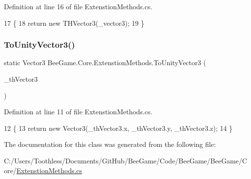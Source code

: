 Definition at line 16 of file Extenstion\+Methods.\+cs.


\begin{DoxyCode}
17         \{
18             \textcolor{keywordflow}{return} \textcolor{keyword}{new} THVector3(\_vector3);
19         \}
\end{DoxyCode}
\mbox{\label{class_bee_game_1_1_core_1_1_extenstion_methods_a95fbadd32275cb0c5fc065655f91bec8}} 
\subsubsection{\texorpdfstring{To\+Unity\+Vector3()}{ToUnityVector3()}}
{\footnotesize\ttfamily static Vector3 Bee\+Game.\+Core.\+Extenstion\+Methods.\+To\+Unity\+Vector3 (\begin{DoxyParamCaption}\item[{this \hyperlink{struct_bee_game_1_1_t_h_vector3}{T\+H\+Vector3}}]{\+\_\+th\+Vector3 }\end{DoxyParamCaption})\hspace{0.3cm}{\ttfamily [static]}}



Definition at line 11 of file Extenstion\+Methods.\+cs.


\begin{DoxyCode}
12         \{
13             \textcolor{keywordflow}{return} \textcolor{keyword}{new} Vector3(\_thVector3.x, \_thVector3.y, \_thVector3.z);
14         \}
\end{DoxyCode}


The documentation for this class was generated from the following file\+:\begin{DoxyCompactItemize}
\item 
C\+:/\+Users/\+Toothless/\+Documents/\+Git\+Hub/\+Bee\+Game/\+Code/\+Bee\+Game/\+Bee\+Game/\+Core/\hyperlink{_extenstion_methods_8cs}{Extenstion\+Methods.\+cs}\end{DoxyCompactItemize}
